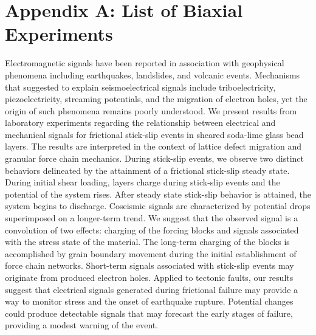 \chapter*{Appendix A: List of Biaxial Experiments}
Electromagnetic signals have been reported in association with geophysical phenomena including earthquakes, landslides, and volcanic events. Mechanisms that suggested to explain seismoelectrical signals include triboelectricity, piezoelectricity, streaming potentials, and the migration
of electron holes, yet the origin of such phenomena remains poorly understood. We present results from laboratory experiments regarding the relationship between electrical and mechanical signals for frictional stick-slip events in sheared soda-lime glass bead layers. The results are interpreted in the context of lattice defect migration and granular force chain mechanics. During stick-slip events, we observe two distinct behaviors delineated by the attainment of a frictional stick-slip steady state. During initial shear loading, layers charge during stick-slip events and the potential of the system rises. After steady state stick-slip behavior is attained, the system begins to discharge. Coseismic signals are characterized by potential drops superimposed on a longer-term trend. We suggest that the observed signal is a convolution of two effects: charging of the forcing blocks and signals associated with the stress state of the material. The long-term charging of the blocks is accomplished by grain boundary movement during the initial establishment of force chain networks. Short-term signals associated with stick-slip events may originate from produced electron holes. Applied to tectonic faults, our results suggest that electrical signals generated during frictional failure may provide a way to monitor stress and the onset of earthquake rupture. Potential changes could produce detectable signals that may forecast the early stages of failure, providing a modest warning of the event.
